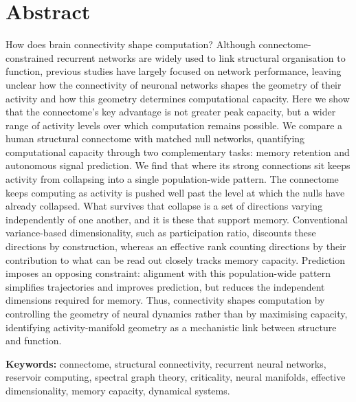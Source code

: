\chapter*{Abstract}
\bigskip


How does brain connectivity shape computation? Although connectome-constrained recurrent 
networks are widely used to link structural organisation to function, previous studies have 
largely focused on network performance, leaving unclear how the connectivity of neuronal networks 
shapes the geometry of their activity and how this geometry determines computational capacity. Here we show that 
the connectome's key advantage is not greater peak capacity, but a wider range of activity levels 
over which computation remains possible. We compare a human structural connectome with matched 
null networks, quantifying computational capacity through two complementary tasks: memory 
retention and autonomous signal prediction. We find that where its strong connections sit keeps 
activity from collapsing into a single population-wide pattern. The connectome keeps computing 
as activity is pushed well past the level at which the nulls have already collapsed. What survives 
that collapse is a set of directions varying independently of one another, and it is these that 
support memory. Conventional variance-based dimensionality, such as participation ratio, discounts 
these directions by construction, whereas an effective rank counting directions by their contribution 
to what can be read out closely tracks memory capacity. Prediction imposes an opposing constraint: 
alignment with this population-wide pattern simplifies trajectories and improves prediction, but 
reduces the independent dimensions required for memory. Thus, connectivity shapes computation by 
controlling the geometry of neural dynamics rather than by maximising capacity, identifying 
activity-manifold geometry as a mechanistic link between structure and function.  

\bigskip
\bigskip


\noindent\textbf{Keywords:} connectome, structural connectivity, recurrent neural networks, reservoir computing, 
spectral graph theory, criticality, neural manifolds, effective dimensionality, memory capacity, dynamical systems.
